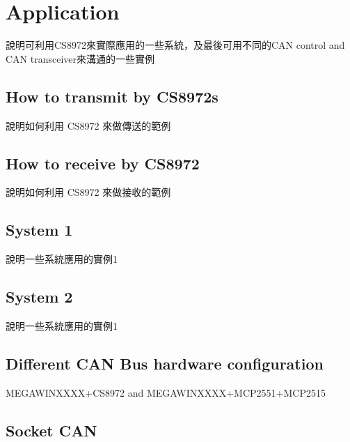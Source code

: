 \chapter{Application}
說明可利用CS8972來實際應用的一些系統，及最後可用不同的CAN control and CAN transceiver來溝通的一些實例
	\section{How to transmit by CS8972s}
	說明如何利用 CS8972 來做傳送的範例
			
	\section{How to receive by CS8972}
	說明如何利用 CS8972 來做接收的範例

	\section{System 1}
	說明一些系統應用的實例1
	
	\section{System 2}
	說明一些系統應用的實例1	
	
	\section{Different CAN Bus hardware configuration}
		MEGAWINXXXX+CS8972 and MEGAWINXXXX+MCP2551+MCP2515
		
	\section{Socket CAN}